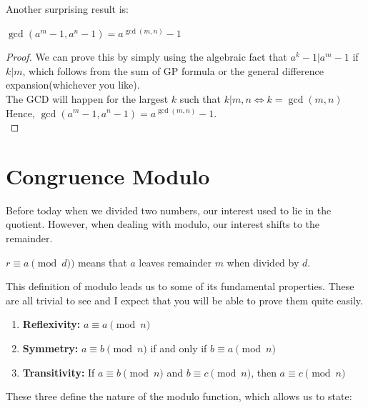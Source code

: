 Another surprising result is:\\
\begin{theorem}
    $\gcd(a^m-1, a^n-1)=a^{\gcd(m,n)}-1$
\end{theorem}
\begin{proof}
    We can prove this by simply using the algebraic fact that $a^k-1|a^m-1$ if $k|m$, which follows from the sum of GP formula or the general difference expansion(whichever you like).\\
    The GCD will happen for the largest $k$ such that $k | m,n \iff k=\gcd(m,n)$\\
    Hence, $\gcd(a^m-1, a^n-1)=a^{\gcd(m,n)}-1$.\\
\end{proof}
\section{Congruence Modulo}
Before today when we divided two numbers, our interest used to lie in the quotient. However, when dealing with modulo, our interest shifts to the remainder. 
\begin{definition}
    $r \equiv a \pmod d)$ means that $a$ leaves remainder $m$ when divided by $d$.
\end{definition}
This definition of modulo leads us to some of its fundamental properties. These are all trivial to see and I expect that you will be able to prove them quite easily.
\begin{theorem}
\begin{enumerate}
    \item \textbf{Reflexivity:} $a \equiv a \pmod{n}$\\
    \item \textbf{Symmetry:} $a \equiv b \pmod{n}$ if and only if $b \equiv a \pmod{n}$ \\
    \item \textbf{Transitivity:} If $a \equiv b \pmod{n}$ and $b \equiv c \pmod{n}$, then $a \equiv c \pmod{n}$\\
\end{enumerate}    
\end{theorem}
These three define the nature of the modulo function, which allows us to state:
